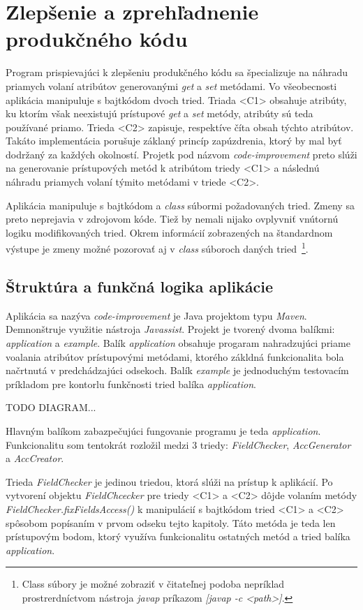 \documentclass[11pt,final,oneside]{fithesis}
\begin{document}
\section{Zlepšenie a zprehľadnenie produkčného kódu}

Program prispievajúci k zlepšeniu produkčného kódu sa špecializuje na náhradu priamych volaní atribútov generovanými \textit{get} a \textit{set} metódami. Vo všeobecnosti aplikácia manipuluje s bajtkódom dvoch tried. Triada <C1> obsahuje atribúty, ku ktorím však neexistujú prístupové \textit{get} a \textit{set} metódy, atribúty sú teda používané priamo. Trieda <C2> zapisuje, respektíve číta obsah týchto atribútov. Takáto implementácia porušuje záklaný princíp zapúzdrenia, ktorý by mal byť dodržaný za každých okolností. Projetk pod názvom \textit{code-improvement} preto slúži na generovanie prístupových metód k atribútom triedy <C1> a následnú náhradu priamych volaní týmito metódami v triede <C2>.

Aplikácia manipuluje s bajtkódom a \textit{class} súbormi požadovaných tried. Zmeny sa preto neprejavia v zdrojovom kóde. Tiež by nemali nijako ovplyvniť vnútornú logiku modifikovaných tried. Okrem informácií zobrazených na štandardnom výstupe je zmeny možné pozorovať aj v \textit{class} súboroch daných tried~\footnote{Class súbory je možné zobraziť v čitateľnej podoba nepríklad prostrerdníctvom nástroja \textit{javap} príkazom \textit{[javap -c <path>]}.}.

\subsection{Štruktúra a funkčná logika aplikácie}
Aplikácia sa nazýva \textit{code-improvement} je Java projektom typu \textit{Maven}. Demnonštruje využitie nástroja \textit{Javassist}. Projekt je tvorený dvoma balíkmi: \textit{application} a \textit{example}. Balík \textit{application} obsahuje progaram nahradzujúci priame voalania atribútov prístupovými metódami, ktorého zákldná funkcionalita bola načrtnutá v predchádzajúci odsekoch. Balík \textit{example} je jednoduchým testovacím príkladom pre kontorlu funkčnosti tried balíka \textit{application}.

TODO DIAGRAM...

Hlavným balíkom zabazpečujúci fungovanie programu je teda \textit{application}. Funkcionalitu som tentokrát rozložil medzi 3 triedy: \textit{FieldChecker}, \textit{AccGenerator} a \textit{AccCreator}.

Trieda \textit{FieldChecker} je jedinou triedou, ktorá slúži na prístup k aplikácií. Po vytvorení objektu \textit{FieldChcecker} pre triedy <C1> a <C2> dôjde volaním metódy \textit{FieldChecker.fixFieldsAccess()} k manipulácií s bajtkódom tried <C1> a <C2> spôsobom popísaním v prvom odseku tejto kapitoly. Táto metóda je teda len prístupovým bodom, ktorý využíva funkcionalitu ostatných metód a tried balíka \textit{application}.
\end{document}
